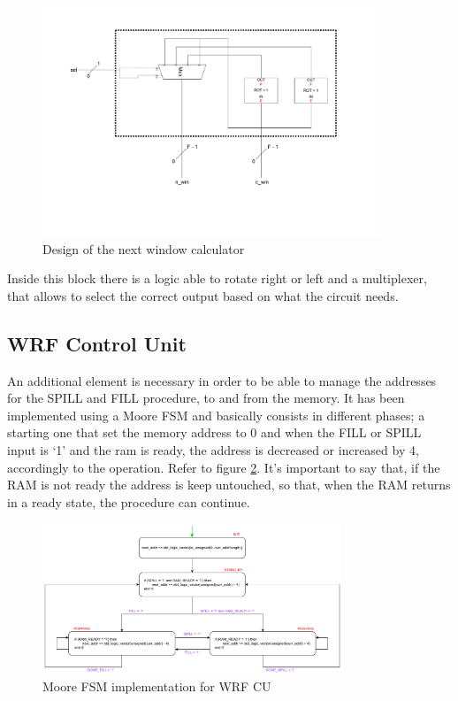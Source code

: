 \begin{figure}[H]
  \centering
  \includegraphics[width=0.9\textwidth]{chapters/4_DecodeStage/images/nwin_cal.pdf}
  \caption{Design of the next window calculator}
  \label{nwin_cal}
\end{figure}

Inside this block there is a logic able to rotate right or left and a multiplexer, that allows to select the correct output based on what the circuit needs. 

\subsection{WRF Control Unit}

An additional element is necessary in order to be able to manage the addresses for the SPILL and FILL procedure, to and from the memory. It has been implemented using a Moore FSM and basically consists in different phases; a starting one that set the memory address to 0 and when the FILL or SPILL input is `1' and the ram is ready, the address is decreased or increased by 4, accordingly to the operation. Refer to figure \ref{wrf_cu}. It's important to say that, if the RAM is not ready the address is keep untouched, so that, when the RAM returns in a ready state, the procedure can continue.


\begin{figure}[ht]
	\centering
	\includegraphics[width=0.8\textwidth]{chapters/4_DecodeStage/images/wRF_CU.pdf}
	\caption{Moore FSM implementation for WRF CU}
	\label{wrf_cu}
\end{figure}

